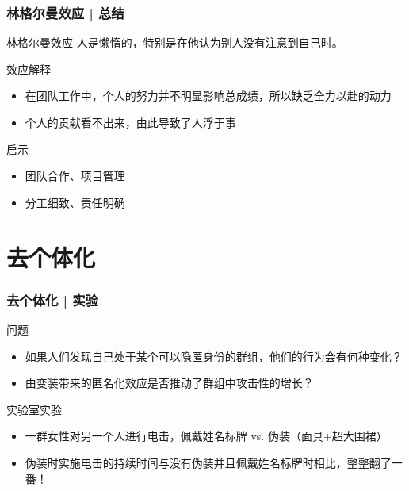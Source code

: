 \begin{frame}
  \frametitle{林格尔曼效应 | \alert{总结}}
  \begin{block}{林格尔曼效应}
    人是懒惰的，特别是在他认为别人没有注意到自己时。
  \end{block}
  \pause
  \begin{block}{效应解释}
    \begin{itemize}
      \item 在团队工作中，个人的努力并不明显影响总成绩，所以缺乏全力以赴的动力
      \item 个人的贡献看不出来，由此导致了人浮于事
    \end{itemize}
  \end{block}
  \pause
  \begin{block}{启示}
    \begin{itemize}
      \item 团队合作、项目管理
      \item 分工细致、责任明确
    \end{itemize}
  \end{block}
\end{frame}

\section{去个体化}
\begin{frame}
  \frametitle{去个体化 | 实验}
  \begin{block}{问题}
    \begin{itemize}
      \item 如果人们发现自己处于某个可以隐匿身份的群组，他们的行为会有何种变化？
      \item 由变装带来的匿名化效应是否推动了群组中攻击性的增长？
    \end{itemize}
  \end{block}
  \pause
  \begin{block}{实验室实验}
    \begin{itemize}
      \item 一群女性对另一个人进行电击，佩戴姓名标牌 vs. 伪装（面具+超大围裙）
      \item 伪装时实施电击的持续时间与没有伪装并且佩戴姓名标牌时相比，整整翻了一番！
    \end{itemize}
  \end{block}
\end{frame}

